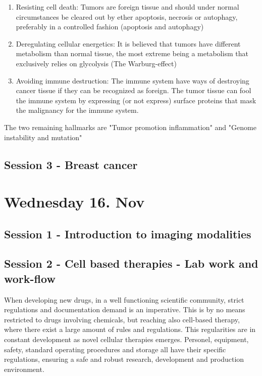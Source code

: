 \documentclass[12p]{article}
\begin{document}
\begin{enumerate}
  \item
    Resisting cell death:
    Tumors are foreign tissue and should under normal circumstances be cleared out by ether apoptosis, necrosis or autophagy, preferably in a controlled fashion (apoptosis and autophagy)
  \item
    Deregulating cellular energetics:
    It is believed that tumors have different metabolism than normal tissue, the most extreme being a metabolism that exclusively relies on glycolysis (The Warburg-effect)
  \item
    Avoiding immune destruction:
    The immune system have ways of destroying cancer tissue if they can be recognized as foreign.
    The tumor tissue can fool the immune system by expressing (or not express) surface proteins that mask the malignancy for the immune system.

\end{enumerate}
    
The two remaining hallmarks are "Tumor promotion inflammation" and "Genome instability and mutation"

\subsection*{Session 3 - Breast cancer}

\section*{Wednesday 16. Nov}

\subsection*{Session 1 - Introduction to imaging modalities}

\subsection*{Session 2 - Cell based therapies - Lab work and work-flow}

When developing new drugs, in a well functioning scientific community, strict regulations and documentation demand is an imperative.
This is by no means restricted to drugs involving chemicals, but reaching also cell-based therapy, where there exist a large amount of rules and regulations.
This regularities are in constant development as novel cellular therapies emerges.
Personel, equipment, safety, standard operating procedures and storage all have their specific regulations, ensuring a safe and robust research, development and production environment.
\end{document}
